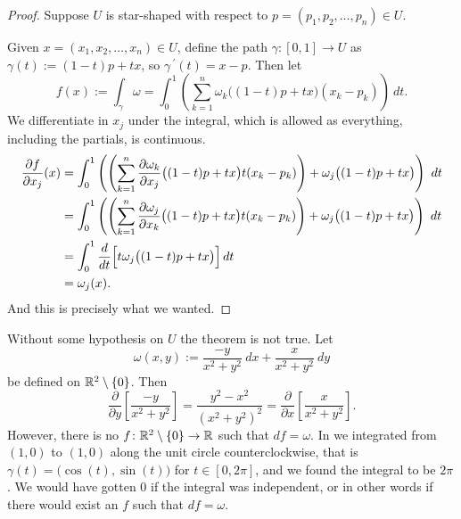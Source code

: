 \begin{proof}
Suppose $U$ is star-shaped with respect to $p=(p_1,p_2,\ldots,p_n) \in U$.

Given $x = (x_1,x_2,\ldots,x_n) \in U$, define the path $\gamma \colon [0,1] \to U$ as
$\gamma(t) := (1-t)p + tx$, so $\gamma^{\:\prime}(t) = x-p$.  Then let
\begin{equation*}
f(x) := \int_{\gamma} \omega
=
\int_0^1
\left(
\sum_{k=1}^n
\omega_k \bigl((1-t)p + tx \bigr) (x_k-p_k)
\right) ~ dt .
\end{equation*}
We differentiate in $x_j$ under the integral, which is allowed as
everything, including the partials, is continuous.
\begin{equation*}
\begin{split}
\frac{\partial f}{\partial x_j}(x) & =
\int_0^1
\left(
\left(
\sum_{k=1}^n
\frac{\partial \omega_k}{\partial x_j} \bigl((1-t)p + tx \bigr) t
(x_k-p_k)
\right)
+
\omega_j \bigl((1-t)p + tx \bigr)
\right)
 ~ dt
\\
& = 
\int_0^1
\left(
\left(
\sum_{k=1}^n
\frac{\partial \omega_j}{\partial x_k} \bigl((1-t)p + tx \bigr) t
(x_k-p_k)
\right)
+
\omega_j \bigl((1-t)p + tx \bigr)
\right) ~ dt
\\
& = 
\int_0^1
\frac{d}{dt}
\Bigl[
t \omega_j\bigl((1-t)p + tx \bigr)
\Bigr]
\,
dt
\\
&= \omega_j(x) .
\end{split}
\end{equation*}
And this is precisely what we wanted.
\end{proof}

\begin{example}
Without some hypothesis on $U$ the theorem is not true.  Let
\begin{equation*}
\omega(x,y) := \frac{-y}{x^2+y^2} ~dx + \frac{x}{x^2+y^2} ~dy
\end{equation*}
be defined on ${\mathbb{R}}^2 \setminus \{ 0 \}$.  Then
\begin{equation*}
\frac{\partial}{\partial y} \left[ 
\frac{-y}{x^2+y^2} \right] =
\frac{y^2-x^2}{{(x^2+y^2)}^2}
=
\frac{\partial}{\partial x} \left[ 
\frac{x}{x^2+y^2} \right] .
\end{equation*}
However, there is no $f \colon {\mathbb{R}}^2 \setminus \{ 0 \} \to {\mathbb{R}}$ such that 
$df = \omega$.  In
 we integrated from $(1,0)$ to $(1,0)$
along the unit circle counterclockwise,
that is $\gamma(t) = \bigl(\cos(t),\sin(t)\bigr)$
for $t \in [0,2\pi]$, and we found the integral to be $2\pi$.  We would have
gotten $0$ if
the integral was independent,
or in other words if there would exist an $f$ such that
$df = \omega$.
\end{example}

